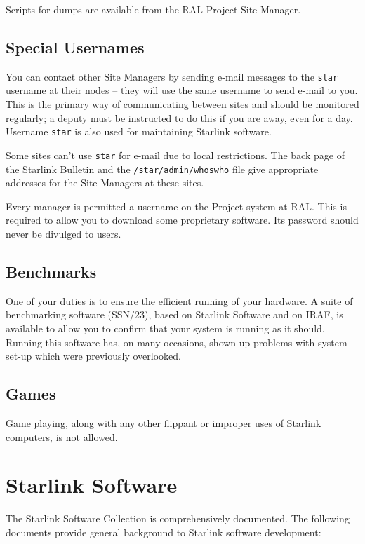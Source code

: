 \documentclass[twoside,11pt]{article}
\newcommand{\xref}[3]{#1}
\begin{document}
Scripts for dumps are available from the RAL Project Site Manager.

\subsection {Special Usernames}

You can contact other Site Managers by sending e-mail messages to the {\tt star}
username at their nodes  -- they will use the same username to send e-mail to
you.
This is the primary way of communicating between sites and
should be monitored regularly; a deputy must be instructed to do this if you
are away, even for a day.
Username {\tt star} is also used for maintaining Starlink software.

Some sites can't use {\tt star} for e-mail due to local restrictions.
The back page of the Starlink Bulletin and the {\tt /star/admin/whoswho} file
give appropriate addresses for the Site Managers at these sites.

Every manager is permitted a username on the Project system at RAL.
This is required to allow you to download some proprietary software.
Its password should never be divulged to users.

\subsection {Benchmarks}

One of your duties is to ensure the efficient running of your hardware.
A suite of benchmarking software
(\xref{SSN/23}{ssn23}{}),
based on Starlink Software and on IRAF, is available to allow you to confirm
that your system is running as it should.
Running this software has, on many occasions, shown up problems with system
set-up which were previously overlooked.

\subsection {Games}

Game playing, along with any other flippant or improper uses of Starlink
computers, is not allowed.

\newpage

\section {\label{starlinksoftware}Starlink Software}

The Starlink Software Collection is comprehensively documented.
The following documents provide general background to Starlink software
development:
\end{document}
